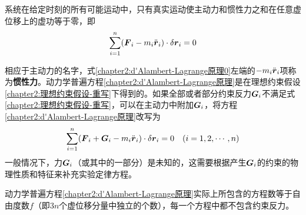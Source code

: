 \begin{theorem}
	系统在给定时刻的所有可能运动中，只有真实运动使主动力和惯性力之和在任意虚位移上的虚功等于零，即
	\begin{equation}
		\sum_{i=1}^n(\boldsymbol{F}_i - m_i \ddot{\boldsymbol{r}}_i) \cdot \delta \boldsymbol{r}_i = 0
		\label{chapter2:d'Alambert-Lagrange原理}
	\end{equation}
\end{theorem}

相应于主动力的名字，式\eqref{chapter2:d'Alambert-Lagrange原理0}左端的$-m_i\ddot{\boldsymbol{r}}_i$项称为{\bf 惯性力}。动力学普遍方程\eqref{chapter2:d'Alambert-Lagrange原理}是在理想约束假设\eqref{chapter2:理想约束假设-重写}下得到的。如果全部或者部分约束反力$\boldsymbol{G}_i$不满足式\eqref{chapter2:理想约束假设-重写}，可以在主动力中附加$\boldsymbol{G}_i$，将方程\eqref{chapter2:d'Alambert-Lagrange原理}改写为
\begin{equation}
	\sum_{i=1}^n (\boldsymbol{F}_i+\boldsymbol{G}_i-m_i\ddot{\boldsymbol{r}}_i)\cdot \delta \boldsymbol{r}_i = 0\quad (i=1,2,\cdots,n)
	\label{chapter2:考虑了非理想约束的d'Alambert-Lagrange原理}
\end{equation}
一般情况下，力$\boldsymbol{G}_i$（或其中的一部分）是未知的，这需要根据产生$\boldsymbol{G}_i$的约束的物理性质和特征来补充实验定律方程。

动力学普遍方程\eqref{chapter2:d'Alambert-Lagrange原理}实际上所包含的方程数等于自由度数$f$（即$3n$个虚位移分量中独立的个数），每一个方程中都不包含约束反力。

